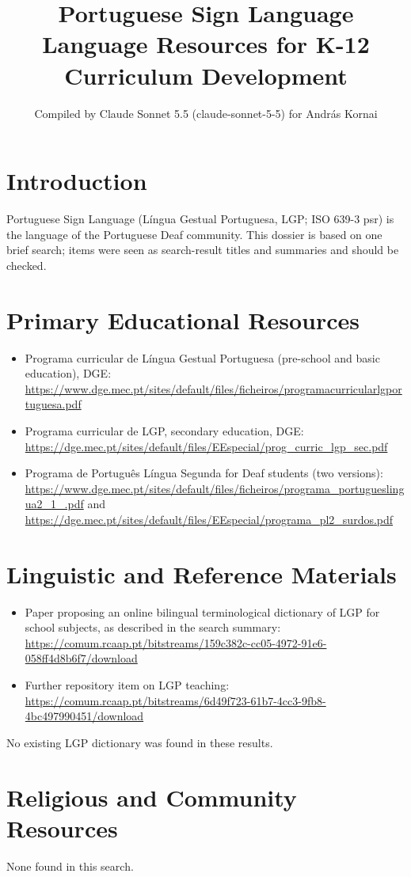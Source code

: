\documentclass[12pt]{article}
\title{Portuguese Sign Language Language Resources for K-12 Curriculum Development}
\author{Compiled by Claude Sonnet 5.5 (claude-sonnet-5-5) for Andr\'as Kornai}
\date{}
\begin{document}
\maketitle

\section{Introduction}
Portuguese Sign Language (L\'ingua Gestual Portuguesa, LGP; ISO 639-3 psr) is the language of the Portuguese Deaf community. This dossier is based on one brief search; items were seen as search-result titles and summaries and should be checked.

\section{Primary Educational Resources}
\begin{itemize}
\item Programa curricular de L\'ingua Gestual Portuguesa (pre-school and basic education), DGE: \url{https://www.dge.mec.pt/sites/default/files/ficheiros/programacurricularlgportuguesa.pdf}
\item Programa curricular de LGP, secondary education, DGE: \url{https://dge.mec.pt/sites/default/files/EEspecial/prog_curric_lgp_sec.pdf}
\item Programa de Portugu\^es L\'ingua Segunda for Deaf students (two versions): \url{https://www.dge.mec.pt/sites/default/files/ficheiros/programa_portugueslingua2_1_.pdf} and \url{https://dge.mec.pt/sites/default/files/EEspecial/programa_pl2_surdos.pdf}
\end{itemize}

\section{Linguistic and Reference Materials}
\begin{itemize}
\item Paper proposing an online bilingual terminological dictionary of LGP for school subjects, as described in the search summary: \url{https://comum.rcaap.pt/bitstreams/159c382c-cc05-4972-91e6-058ff4d8b6f7/download}
\item Further repository item on LGP teaching: \url{https://comum.rcaap.pt/bitstreams/6d49f723-61b7-4cc3-9fb8-4bc497990451/download}
\end{itemize}
No existing LGP dictionary was found in these results.

\section{Religious and Community Resources}
None found in this search.
\end{document}
